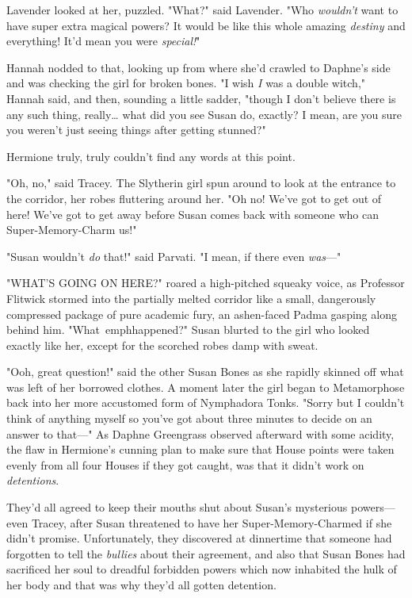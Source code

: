 Lavender looked at her, puzzled. "What?" said Lavender. "Who \emph{wouldn't} 
want to have super extra magical powers? It would be like this whole amazing 
\emph{destiny} and everything! It'd mean you were \emph{special!}"

Hannah nodded to that, looking up from where she'd crawled to Daphne's side and 
was checking the girl for broken bones. "I wish \emph{I} was a double witch," 
Hannah said, and then, sounding a little sadder, "though I don't believe there 
is any such thing, really{\ldots} what did you see Susan do, exactly? I mean, 
are you sure you weren't just seeing things after getting stunned?"

Hermione truly, truly couldn't find any words at this point.

"Oh, no," said Tracey. The Slytherin girl spun around to look at the entrance 
to the corridor, her robes fluttering around her. "Oh no! We've got to get out 
of here! We've got to get away before Susan comes back with someone who can 
Super-Memory-Charm us!"

"Susan wouldn't \emph{do} that!" said Parvati. "I mean, if there even 
\emph{was}---"

"WHAT'S GOING ON HERE?" roared a high-pitched squeaky voice, as Professor 
Flitwick stormed into the partially melted corridor like a small, dangerously 
compressed package of pure academic fury, an ashen-faced Padma gasping along 
behind him.
\sbreak
"What\ emph{happened?}" Susan blurted to the girl who looked exactly like her, 
except for the scorched robes damp with sweat.

"Ooh, great question!" said the other Susan Bones as she rapidly skinned off 
what was left of her borrowed clothes. A moment later the girl began to 
Metamorphose back into her more accustomed form of Nymphadora Tonks. "Sorry but 
I couldn't think of anything myself so you've got about three minutes to decide 
on an answer to that---"
\sbreak
As Daphne Greengrass observed afterward with some acidity, the flaw in 
Hermione's cunning plan to make sure that House points were taken evenly from 
all four Houses if they got caught, was that it didn't work on 
\emph{detentions}.

They'd all agreed to keep their mouths shut about Susan's mysterious 
powers---even Tracey, after Susan threatened to have her Super-Memory-Charmed 
if she didn't promise. Unfortunately, they discovered at dinnertime that 
someone had forgotten to tell the \emph{bullies} about their agreement, and 
also that Susan Bones had sacrificed her soul to dreadful forbidden powers 
which now inhabited the hulk of her body and that was why they'd all gotten 
detention.

